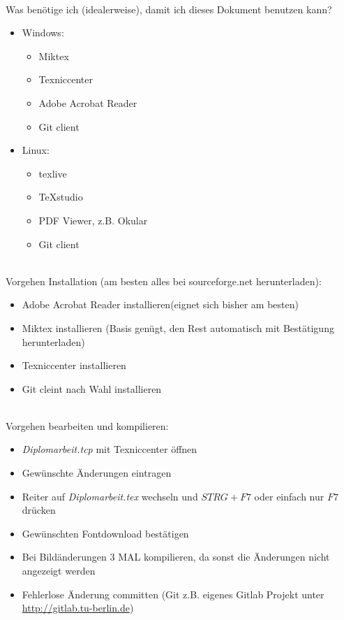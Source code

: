 \noindent\\ Was benötige ich (idealerweise), damit ich dieses Dokument benutzen kann?
\begin{itemize}
\item Windows:
\begin{itemize}
\item Miktex
\item Texniccenter
\item Adobe Acrobat Reader
\item Git client
\end{itemize}
\item Linux:
\begin{itemize}
\item texlive
\item TeXstudio
\item PDF Viewer, z.B. Okular
\item Git client
\end{itemize}
\end{itemize}

\noindent\\ Vorgehen Installation (am besten alles bei sourceforge.net herunterladen):
\begin{itemize}
\item Adobe Acrobat Reader installieren(eignet sich bisher am besten)
\item Miktex installieren (Basis genügt, den Rest automatisch mit Bestätigung herunterladen)
\item Texniccenter installieren
\item Git cleint nach Wahl installieren
\end{itemize}

\noindent\\ Vorgehen bearbeiten und kompilieren:
\begin{itemize}
\item {\em Diplomarbeit.tcp} mit Texniccenter öffnen
\item Gewünschte Änderungen eintragen
\item Reiter auf {\em Diplomarbeit.tex} wechseln und $STRG+F7$ oder einfach nur $F7$ drücken
\item Gewünschten Fontdownload bestätigen
\item Bei Bildänderungen $3$ MAL kompilieren, da sonst die Änderungen nicht angezeigt werden
\item Fehlerlose Änderung committen (Git z.B. eigenes Gitlab Projekt unter \url{http://gitlab.tu-berlin.de})
\end{itemize}

